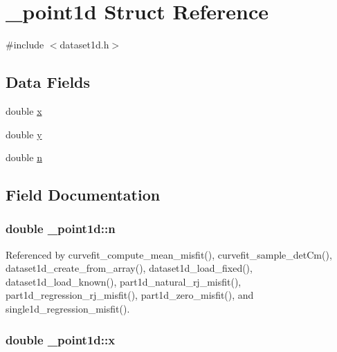 \hypertarget{struct__point1d}{}\section{\+\_\+point1d Struct Reference}
\label{struct__point1d}


{\ttfamily \#include $<$dataset1d.\+h$>$}

\subsection*{Data Fields}
\begin{DoxyCompactItemize}
\item 
double \hyperlink{struct__point1d_a21c8e736c24ef069ddc04eab697bb569}{x}
\item 
double \hyperlink{struct__point1d_abc89203bf5b6194fc3661e45b7b8dfa3}{y}
\item 
double \hyperlink{struct__point1d_a7d52dd65b5d5956c8493038d6bdd3f02}{n}
\end{DoxyCompactItemize}


\subsection{Field Documentation}
\subsubsection[{\texorpdfstring{n}{n}}]{\setlength{\rightskip}{0pt plus 5cm}double \+\_\+point1d\+::n}\hypertarget{struct__point1d_a7d52dd65b5d5956c8493038d6bdd3f02}{}\label{struct__point1d_a7d52dd65b5d5956c8493038d6bdd3f02}


Referenced by curvefit\+\_\+compute\+\_\+mean\+\_\+misfit(), curvefit\+\_\+sample\+\_\+det\+Cm(), dataset1d\+\_\+create\+\_\+from\+\_\+array(), dataset1d\+\_\+load\+\_\+fixed(), dataset1d\+\_\+load\+\_\+known(), part1d\+\_\+natural\+\_\+rj\+\_\+misfit(), part1d\+\_\+regression\+\_\+rj\+\_\+misfit(), part1d\+\_\+zero\+\_\+misfit(), and single1d\+\_\+regression\+\_\+misfit().

\subsubsection[{\texorpdfstring{x}{x}}]{\setlength{\rightskip}{0pt plus 5cm}double \+\_\+point1d\+::x}\hypertarget{struct__point1d_a21c8e736c24ef069ddc04eab697bb569}{}\label{struct__point1d_a21c8e736c24ef069ddc04eab697bb569}


